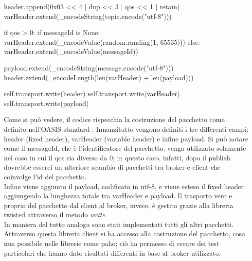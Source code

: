 \documentclass[Lau,binding=0.6cm,noexaminfo=true]{sapthesis}
\begin{document}
\begin{large}
\begin{python}
    header.append(0x03 << 4 | dup << 3 | qos << 1 | retain)
    varHeader.extend(_encodeString(topic.encode("utf-8")))
    
    if qos > 0:
    	if messageId is None:
    		varHeader.extend(_encodeValue(random.randing(1, 65535)))
    	else:
    		varHeader.extend(_encodeValue(messageId))
    
    payload.extend(_encodeString(message.encode("utf-8")))
    header.extend(_encodeLength(len(varHeader) + len(payload)))
    
    self.transport.write(header)
    self.transport.write(varHeader)
    self.transport.write(payload)
\end{python}

Come si può vedere, il codice rispecchia la costruzione del pacchetto come definito nell'OASIS standard \cite{oasis:publish}. Innanzitutto vengono definiti i tre differenti campi: header (fixed header), varHeader (variable header) e infine payload. Si può notare come il messageId, che è l'identificatore del pacchetto, venga utilizzato solamente nel caso in cui il qos sia diverso da 0; in questo caso, infatti, dopo il publish dovrebbe esserci un ulteriore scambio di pacchetti tra broker e client che coinvolge l'id del pacchetto. \\
Infine viene aggiunto il payload, codificato in utf-8, e viene esteso il fixed header aggiungendo la lunghezza totale tra varHeader e payload. Il trasporto vero e proprio del pacchetto dal client al broker, invece, è gestito grazie alla libreria twisted attraverso il metodo \textit{write}. \\

In maniera del tutto analoga sono stati implementati tutti gli altri pacchetti. Attraverso questa libreria client si ha accesso alla costruzione del pacchetto, cosa non possibile nelle librerie come paho; ciò ha permesso di creare dei test particolari che hanno dato risultati differenti in base al broker utilizzato.

\end{large}


\end{document}
